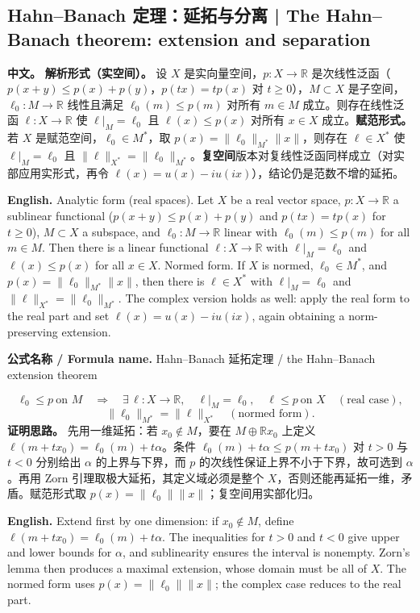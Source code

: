 \documentclass[UTF8,11pt,a4paper]{ctexart}
\newcommand{\EN}[1]{\par\noindent \textbf{English.} #1\par}
\newcommand{\FORMULA}[2]{\par\noindent\textbf{公式名称 / Formula name.} #1 / #2\par}
\newcommand{\APS}[2]{\par\noindent\textbf{中文。} #1\par\noindent\textbf{English.} #2\par\smallskip}
\begin{document}
\subsection{Hahn--Banach 定理：延拓与分离 | The Hahn--Banach theorem: extension and separation}
\APS{\textbf{解析形式（实空间）。} 设 $X$ 是实向量空间，$p:X\to\mathbb R$ 是次线性泛函（$p(x+y)\le p(x)+p(y)$，$p(tx)=tp(x)$ 对 $t\ge0$），$M\subset X$ 是子空间，$\ell_0:M\to\mathbb R$ 线性且满足 $\ell_0(m)\le p(m)$ 对所有 $m\in M$ 成立。则存在线性泛函 $\ell:X\to\mathbb R$ 使 $\ell|_M=\ell_0$ 且 $\ell(x)\le p(x)$ 对所有 $x\in X$ 成立。\textbf{赋范形式。} 若 $X$ 是赋范空间，$\ell_0\in M^*$，取 $p(x)=\|\ell_0\|_{M^*}\|x\|$，则存在 $\ell\in X^*$ 使 $\ell|_M=\ell_0$ 且 $\|\ell\|_{X^*}=\|\ell_0\|_{M^*}$。\textbf{复空间}版本对复线性泛函同样成立（对实部应用实形式，再令 $\ell(x)=u(x)-iu(ix)$），结论仍是范数不增的延拓。}{Analytic form (real spaces). Let $X$ be a real vector space, $p:X\to\mathbb R$ a sublinear functional ($p(x+y)\le p(x)+p(y)$ and $p(tx)=tp(x)$ for $t\ge0$), $M\subset X$ a subspace, and $\ell_0:M\to\mathbb R$ linear with $\ell_0(m)\le p(m)$ for all $m\in M$. Then there is a linear functional $\ell:X\to\mathbb R$ with $\ell|_M=\ell_0$ and $\ell(x)\le p(x)$ for all $x\in X$. Normed form. If $X$ is normed, $\ell_0\in M^*$, and $p(x)=\|\ell_0\|_{M^*}\|x\|$, then there is $\ell\in X^*$ with $\ell|_M=\ell_0$ and $\|\ell\|_{X^*}=\|\ell_0\|_{M^*}$. The complex version holds as well: apply the real form to the real part and set $\ell(x)=u(x)-iu(ix)$, again obtaining a norm-preserving extension.}
\FORMULA{Hahn--Banach 延拓定理}{the Hahn--Banach extension theorem}
\[
\ell_0\le p\ \text{on }M
\quad\Longrightarrow\quad
\exists\,\ell:X\to\mathbb R,\quad
\ell|_M=\ell_0,\quad \ell\le p\ \text{on }X\quad(\text{real case}),
\]
\[
\|\ell_0\|_{M^*}=\|\ell\|_{X^*}\quad(\text{normed form}).
\]
\noindent\textbf{证明思路。} 先用一维延拓：若 $x_0\notin M$，要在 $M\oplus\mathbb Rx_0$ 上定义 $\ell(m+tx_0)=\ell_0(m)+t\alpha$。条件 $\ell_0(m)+t\alpha\le p(m+tx_0)$ 对 $t>0$ 与 $t<0$ 分别给出 $\alpha$ 的上界与下界，而 $p$ 的次线性保证上界不小于下界，故可选到 $\alpha$。再用 Zorn 引理取极大延拓，其定义域必须是整个 $X$，否则还能再延拓一维，矛盾。赋范形式取 $p(x)=\|\ell_0\|\|x\|$；复空间用实部化归。\EN{Extend first by one dimension: if $x_0\notin M$, define $\ell(m+tx_0)=\ell_0(m)+t\alpha$. The inequalities for $t>0$ and $t<0$ give upper and lower bounds for $\alpha$, and sublinearity ensures the interval is nonempty. Zorn's lemma then produces a maximal extension, whose domain must be all of $X$. The normed form uses $p(x)=\|\ell_0\|\|x\|$; the complex case reduces to the real part.}
\end{document}
